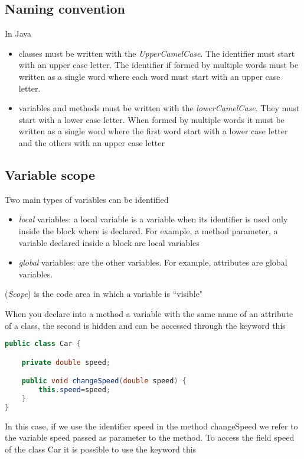 \documentclass{article}
\begin{document}
\subsection{Naming convention}
In Java 
\begin{itemize}
\item classes must be written with the \emph{UpperCamelCase}. The identifier must start with an upper case letter. The identifier if formed by multiple words must be written as a single word where each word must start with an upper case letter.
\item variables and methods must be written with the \emph{lowerCamelCase}. They must start with a lower case letter. When formed by multiple words it must be written as a single word where the first word start with a lower case letter and the others with an upper case letter
\end{itemize}



\subsection{Variable scope}
Two main types of variables can be identified
\begin{itemize}
\item \emph{local} variables: a local variable is a variable when its identifier is used only inside the block where is declared.
For example, a method parameter, a variable declared inside a block are local variables
\item \emph{global} variables: are the other variables. For example, attributes are global variables.
\end{itemize}

\begin{mydef} (\emph{Scope}) is the code area in which a variable is ``visible"
\end{mydef}
When you declare into a method a variable with the same name of an attribute of a class, the second is hidden and can be accessed through the keyword this
\begin{lstlisting}[language=Java,escapechar=|]
public class Car {

	private double speed;

	public void changeSpeed(double speed) {
        this.speed=speed;   
   	}
}
\end{lstlisting}
In this case, if we use the identifier speed in the method changeSpeed we refer to the variable speed passed as parameter to the method. To access the field speed of the class Car it is possible to use the keyword this
\end{document}
